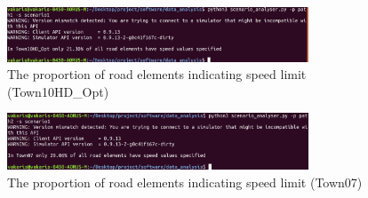 \begin{figure} [h]
    \centering
    \includegraphics[width = 0.8\textwidth]{research_paper/Images/town10_inaccurate.png}
    \caption{The proportion of road elements indicating speed limit (Town10HD\_Opt)}
    \label{fig:town10_speed}
\end{figure}

\begin{figure} [h]
    \centering
    \includegraphics[width = 0.8\textwidth]{research_paper/Images/town7_inaccurate.png}
    \caption{The proportion of road elements indicating speed limit (Town07)}
    \label{fig:town07_speed}
\end{figure}